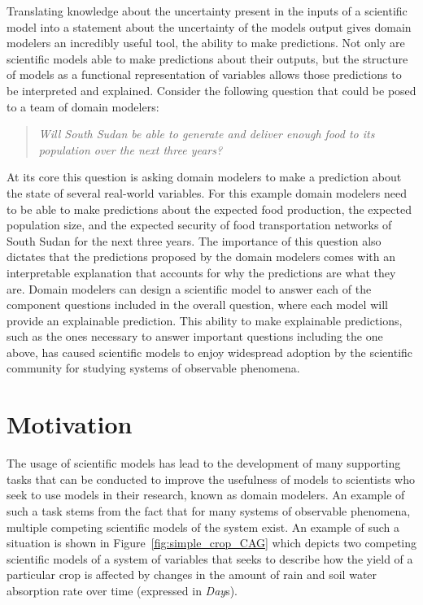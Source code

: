 Translating knowledge about the uncertainty present in the inputs of a scientific model into a statement about the uncertainty of the models output gives domain modelers an incredibly useful tool, the ability to make predictions.
Not only are scientific models able to make predictions about their outputs, but the structure of models as a functional representation of variables allows those predictions to be interpreted and explained.
Consider the following question that could be posed to a team of domain modelers:
\begin{quote}
\textit{Will South Sudan be able to generate and deliver enough food to its population over the next three years?}
\end{quote}
At its core this question is asking domain modelers to make a prediction about the state of several real-world variables.
For this example domain modelers need to be able to make predictions about the expected food production, the expected population size, and the expected security of food transportation networks of South Sudan for the next three years.
The importance of this question also dictates that the predictions proposed by the domain modelers comes with an interpretable explanation that accounts for why the predictions are what they are.
Domain modelers can design a scientific model to answer each of the component questions included in the overall question, where each model will provide an explainable prediction.
This ability to make explainable predictions, such as the ones necessary to answer important questions including the one above, has caused scientific models to enjoy widespread adoption by the scientific community for studying systems of observable phenomena.

\section{Motivation\label{sec:motivation}}
The usage of scientific models has lead to the development of many supporting tasks that can be conducted to improve the usefulness of models to scientists who seek to use models in their research, known as domain modelers.
An example of such a task stems from the fact that for many systems of observable phenomena, multiple competing scientific models of the system exist.
An example of such a situation is shown in Figure~\ref{fig:simple_crop_CAG} which depicts two competing scientific models of a system of variables that seeks to describe how the yield of a particular crop is affected by changes in the amount of rain and soil water absorption rate over time (expressed in \emph{Day}s).

